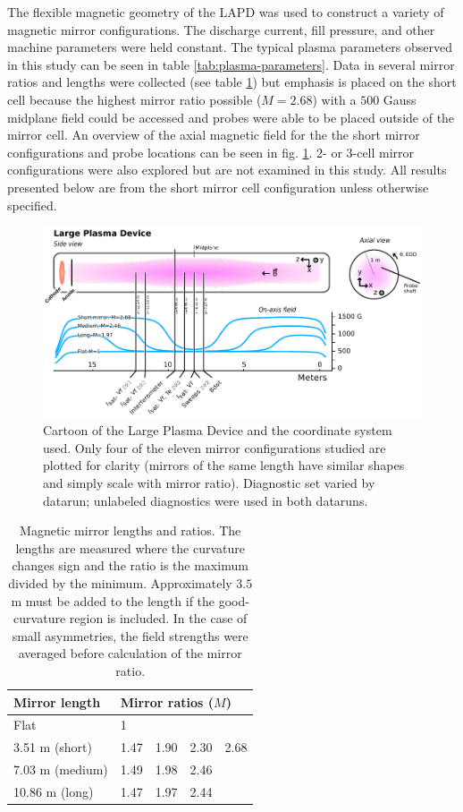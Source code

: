 The flexible magnetic geometry of the LAPD was used to construct a variety of magnetic mirror configurations. The discharge current, fill pressure, and other machine parameters were held constant. The typical plasma parameters observed in this study can be seen in table \ref{tab:plasma-parameters}. 
Data in several mirror ratios and lengths were collected (see table \ref{tab:fields}) but emphasis is placed on the short cell because the highest mirror ratio possible ($M=2.68$) with a $500$ Gauss midplane field could be accessed and probes were able to be placed outside of the mirror cell. An overview of the axial magnetic field for the the short mirror configurations and probe locations can be seen in fig. \ref{fig:magnetic_geometry}. 2- or 3-cell mirror configurations were also explored but are not examined in this study. All results presented below are from the short mirror cell configuration unless otherwise specified.

\begin{figure}
    \centering
    \includegraphics[width=\textwidth]{figures/fig1.pdf}
    \caption{Cartoon of the Large Plasma Device and the coordinate system used. Only four of the eleven mirror configurations studied are plotted for clarity (mirrors of the same length have similar shapes and simply scale with mirror ratio). Diagnostic set varied by datarun; unlabeled diagnostics were used in both dataruns.}
    \label{fig:magnetic_geometry}
\end{figure}

\begin{table}
 \centering
 \begin{tabular}{l l l l l}
 Mirror length & \multicolumn{4}{l}{Mirror ratios ($M$)} \\
 \hline
 Flat & 1 & & & \\
  3.51 m (short) & 1.47 & 1.90 & 2.30 & 2.68 \\ 
 7.03 m (medium) & 1.49 & 1.98 & 2.46 & \\
 10.86 m (long) & 1.47 & 1.97 & 2.44 & \\
 \end{tabular}
\caption{\label{tab:fields}Magnetic mirror lengths and ratios. The lengths are measured where the curvature changes sign and the ratio is the maximum divided by the minimum. Approximately $3.5$m must be added to the length if the good-curvature region is included. In the case of small asymmetries, the field strengths were averaged before calculation of the mirror ratio.}
\end{table}

